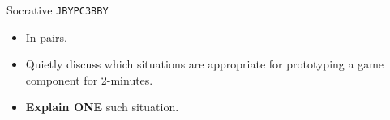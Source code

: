 \begin{frame}[fragile]{Socrative \texttt{JBYPC3BBY}}
	\begin{itemize}
		\item In pairs.
		\item Quietly discuss which situations are appropriate for prototyping a game component for 2-minutes.
		\item \textbf{Explain ONE} such situation.
	\end{itemize}
\end{frame}